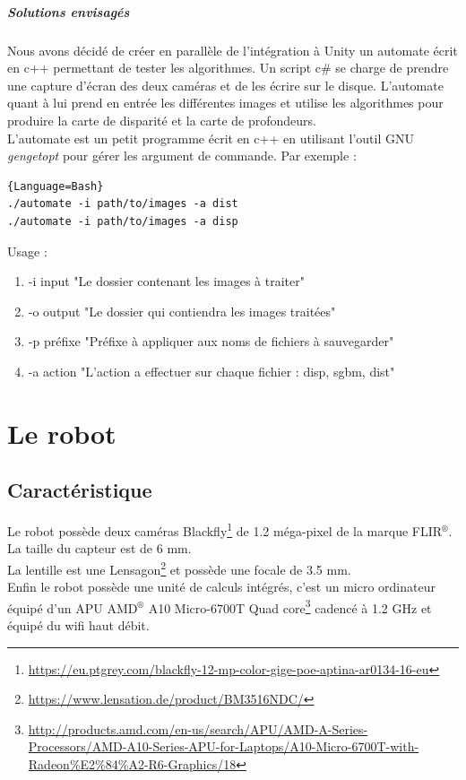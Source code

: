 \documentclass[12pt,a4paper]{report}
\begin{document}
\paragraph{Solutions envisagés}
Nous avons décidé de créer en parallèle de l'intégration à Unity un automate écrit en c++ permettant de tester les algorithmes. Un script c\# se charge de prendre une capture d'écran des deux caméras et de les écrire sur le disque. L'automate quant à lui prend en entrée les différentes images et utilise les algorithmes pour produire la carte de disparité et la carte de profondeurs.\\
L'automate est un petit programme écrit en c++ en utilisant l'outil GNU \textit{gengetopt} pour gérer les argument de commande. Par exemple :\\

\begin{lstlisting}{Language=Bash}
./automate -i path/to/images -a dist
./automate -i path/to/images -a disp
\end{lstlisting}

Usage :
\begin{enumerate}
\item[] -i input "Le dossier contenant les images à traiter"
\item[] -o output "Le dossier qui contiendra les images traitées"
\item[] -p préfixe "Préfixe à appliquer aux noms de fichiers à sauvegarder"
\item[] -a action "L'action a effectuer sur chaque fichier : disp, sgbm, dist"
\end{enumerate}

\chapter{Le robot}

\section{Caractéristique}
Le robot possède deux caméras Blackfly\footnote{\url{https://eu.ptgrey.com/blackfly-12-mp-color-gige-poe-aptina-ar0134-16-eu}} de 1.2 méga-pixel de la marque FLIR$^{\text{®}}$. La taille du capteur est de 6 mm.\\
La lentille est une Lensagon\footnote{\url{https://www.lensation.de/product/BM3516NDC/}} et possède une focale de 3.5 mm. 
\\Enfin le robot possède une unité de calculs intégrés, c'est un micro ordinateur équipé d'un APU AMD$^{\text{®}}$ A10 Micro-6700T Quad core\footnote{\url{http://products.amd.com/en-us/search/APU/AMD-A-Series-Processors/AMD-A10-Series-APU-for-Laptops/A10-Micro-6700T-with-Radeon\%E2\%84\%A2-R6-Graphics/18}}  cadencé à 1.2 GHz et équipé du wifi haut débit.
\end{document}
